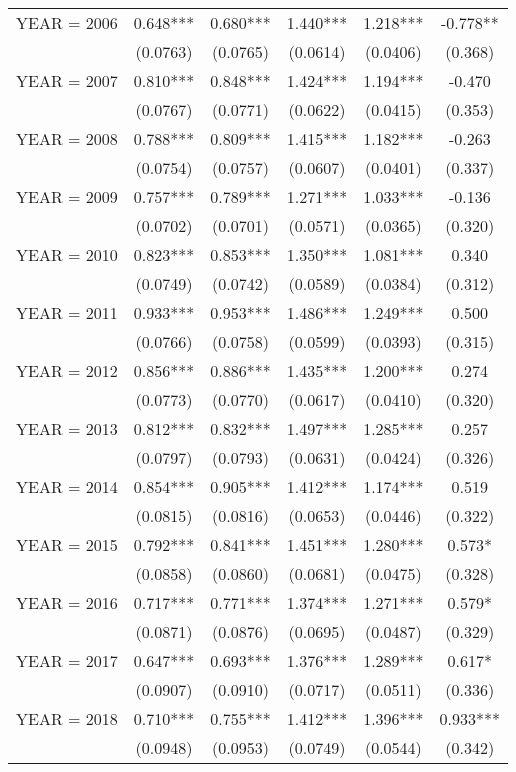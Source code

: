 \begin{tabular}{lccccc}
YEAR = 2006 & 0.648*** & 0.680*** & 1.440*** & 1.218*** & -0.778** \\
 & (0.0763) & (0.0765) & (0.0614) & (0.0406) & (0.368) \\
YEAR = 2007 & 0.810*** & 0.848*** & 1.424*** & 1.194*** & -0.470 \\
 & (0.0767) & (0.0771) & (0.0622) & (0.0415) & (0.353) \\
YEAR = 2008 & 0.788*** & 0.809*** & 1.415*** & 1.182*** & -0.263 \\
 & (0.0754) & (0.0757) & (0.0607) & (0.0401) & (0.337) \\
YEAR = 2009 & 0.757*** & 0.789*** & 1.271*** & 1.033*** & -0.136 \\
 & (0.0702) & (0.0701) & (0.0571) & (0.0365) & (0.320) \\
YEAR = 2010 & 0.823*** & 0.853*** & 1.350*** & 1.081*** & 0.340 \\
 & (0.0749) & (0.0742) & (0.0589) & (0.0384) & (0.312) \\
YEAR = 2011 & 0.933*** & 0.953*** & 1.486*** & 1.249*** & 0.500 \\
 & (0.0766) & (0.0758) & (0.0599) & (0.0393) & (0.315) \\
YEAR = 2012 & 0.856*** & 0.886*** & 1.435*** & 1.200*** & 0.274 \\
 & (0.0773) & (0.0770) & (0.0617) & (0.0410) & (0.320) \\
YEAR = 2013 & 0.812*** & 0.832*** & 1.497*** & 1.285*** & 0.257 \\
 & (0.0797) & (0.0793) & (0.0631) & (0.0424) & (0.326) \\
YEAR = 2014 & 0.854*** & 0.905*** & 1.412*** & 1.174*** & 0.519 \\
 & (0.0815) & (0.0816) & (0.0653) & (0.0446) & (0.322) \\
YEAR = 2015 & 0.792*** & 0.841*** & 1.451*** & 1.280*** & 0.573* \\
 & (0.0858) & (0.0860) & (0.0681) & (0.0475) & (0.328) \\
YEAR = 2016 & 0.717*** & 0.771*** & 1.374*** & 1.271*** & 0.579* \\
 & (0.0871) & (0.0876) & (0.0695) & (0.0487) & (0.329) \\
YEAR = 2017 & 0.647*** & 0.693*** & 1.376*** & 1.289*** & 0.617* \\
 & (0.0907) & (0.0910) & (0.0717) & (0.0511) & (0.336) \\
YEAR = 2018 & 0.710*** & 0.755*** & 1.412*** & 1.396*** & 0.933*** \\
 & (0.0948) & (0.0953) & (0.0749) & (0.0544) & (0.342) \\

\end{tabular}
